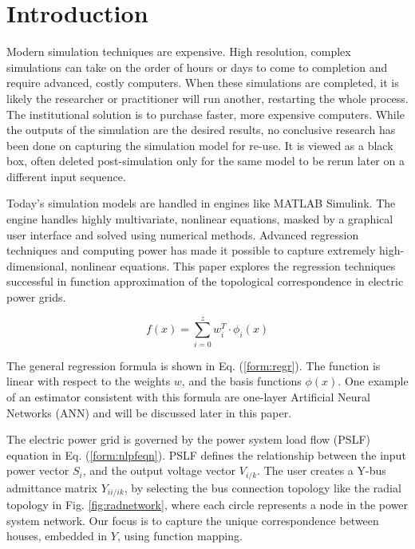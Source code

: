 \documentclass[conference]{IEEEtran}
\begin{document}
%
\IEEEpeerreviewmaketitle


\section{Introduction}
\label{sec:intro}
Modern simulation techniques are expensive. High resolution, complex simulations can take on the order of hours or days to come to completion and require advanced, costly computers. When these simulations are completed, it is likely the researcher or practitioner will run another, restarting the whole process. The institutional solution is to purchase faster, more expensive computers. While the outputs of the simulation are the desired results, no conclusive research has been done on capturing the simulation model for re-use. It is viewed as a black box, often deleted post-simulation only for the same model to be rerun later on a different input sequence.

Today's simulation models are handled in engines like MATLAB Simulink. The engine handles highly multivariate, nonlinear equations, masked by a graphical user interface and solved using numerical methods. Advanced regression techniques and computing power has made it possible to capture extremely high-dimensional, nonlinear equations. This paper explores the regression techniques successful in function approximation of the topological correspondence in electric power grids.

\begin{equation} f(x) = \sum_{i =0}^{z}w_{i}^{T} \cdot \phi_{i}(x) \label{form:regr} \end{equation} 

The general regression formula is shown in Eq. (\ref{form:regr}). The function is linear with respect to the weights $w$, and the basis functions $\phi(x)$. One example of an estimator consistent with this formula are one-layer Artificial Neural Networks (ANN) and will be discussed later in this paper.

The electric power grid is governed by the power system load flow (PSLF) equation in Eq. (\ref{form:nlpfeqn}). PSLF defines the relationship between the input power vector $S_{i}$, and the output voltage vector $V_{i/k}$. The user creates a Y-bus admittance matrix $Y_{ii/ik}$, by selecting the bus connection topology like the radial topology in Fig. \ref{fig:radnetwork}, where each circle represents a node in the power system network. Our focus is to capture the unique correspondence between houses, embedded in $Y$, using function mapping.
\end{document}
